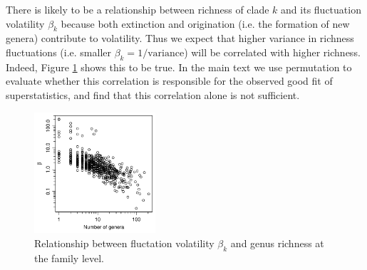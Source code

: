 \documentclass[12pt]{article}
\begin{document}
There is likely to be a relationship between richness of clade $k$ and
its fluctuation volatility $\beta_k$ because both extinction and
origination (i.e. the formation of new genera) contribute to
volatility. Thus we expect that higher variance in richness
fluctuations (i.e. smaller $\beta_k = 1/\text{variance}$) will be
correlated with higher richness.  Indeed, Figure
\ref{figSupp:betaByRich} shows this to be true. In the main text we
use permutation to evaluate whether this correlation is responsible
for the observed good fit of superstatistics, and find that this
correlation alone is not sufficient.

\begin{figure}[!hp]
  \centering
  \includegraphics[width=0.4\textwidth]{../../figSupp_betaByRich.pdf} 
  \caption{Relationship between fluctation volatility $\beta_k$ and
    genus richness at the family level.}
  \label{figSupp:betaByRich}
\end{figure}


% 
\end{document}
